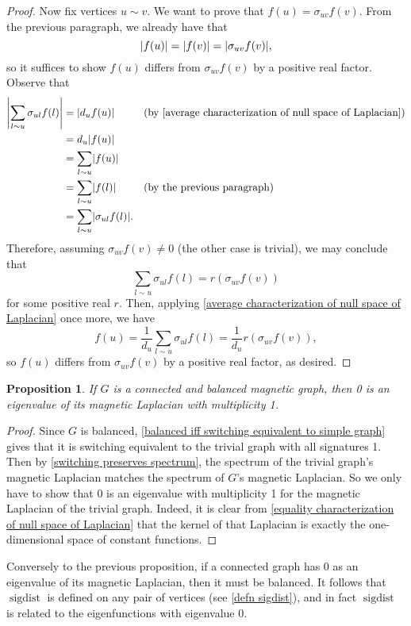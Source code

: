 \documentclass{article}
\newtheorem{prop}[thm]{Proposition}
\theoremstyle{definition}
\DeclarePairedDelimiter\abs{\lvert}{\rvert}
\DeclareMathOperator{\sigdist}{sigdist}
\begin{document}
\begin{proof}
    Now fix vertices $u \sim v$. We want to prove that $f(u) = \sigma_{uv} f(v)$. From the previous paragraph, we already have that
    $$\abs*{f(u)} = \abs*{f(v)} = \abs*{\sigma_{uv} f(v)},$$
    so it suffices to show $f(u)$ differs from $\sigma_{uv} f(v)$ by a positive real factor. Observe that 
    \begin{align*}
        \abs*{\sum_{l \sim u} \sigma_{ul}f(l)} &= \abs*{d_u f(u)} && \text{(by \cref{average characterization of null space of Laplacian})} \\
        &= d_u \abs*{f(u)} \\
        &= \sum_{l \sim u} \abs*{f(u)} \\
        &= \sum_{l \sim u} \abs*{f(l)} && \text{(by the previous paragraph)} \\
        &= \sum_{l \sim u} \abs*{\sigma_{ul} f(l)}.
    \end{align*}
    Therefore, assuming $\sigma_{uv} f(v) \neq 0$ (the other case is trivial), we may conclude that 
    $$\sum_{l \sim u} \sigma_{ul}f(l) = r (\sigma_{uv}f(v))$$
    for some positive real $r$. Then, applying \cref{average characterization of null space of Laplacian} once more, we have
    $$
        f(u) 
        = \frac{1}{d_u} \sum_{l \sim u} \sigma_{ul}f(l)
        = \frac{1}{d_u} r (\sigma_{uv} f(v)),
    $$
    so $f(u)$ differs from $\sigma_{uv} f(v)$ by a positive real factor, as desired.
\end{proof}

\begin{prop}\label{multiplicity of 0 for connected balanced graph}
    If $G$ is a connected and balanced magnetic graph, then 0 is an eigenvalue of its magnetic Laplacian with multiplicity 1.
\end{prop}
\begin{proof}
    Since $G$ is balanced, \cref{balanced iff switching equivalent to simple graph} gives that it is switching equivalent to the trivial graph with all signatures 1. Then by \cref{switching preserves spectrum}, the spectrum of the trivial graph's magnetic Laplacian matches the spectrum of $G$'s magnetic Laplacian. So we only have to show that 0 is an eigenvalue with multiplicity 1 for the magnetic Laplacian of the trivial graph. Indeed, it is clear from \cref{equality characterization of null space of Laplacian} that the kernel of that Laplacian is exactly the one-dimensional space of constant functions. 
\end{proof}

Conversely to the previous proposition, if a connected graph has 0 as an eigenvalue of its magnetic Laplacian, then it must be balanced. It follows that $\sigdist$ is defined on any pair of vertices (see \cref{defn sigdist}), and in fact $\sigdist$ is related to the eigenfunctions with eigenvalue 0.
\end{document}
